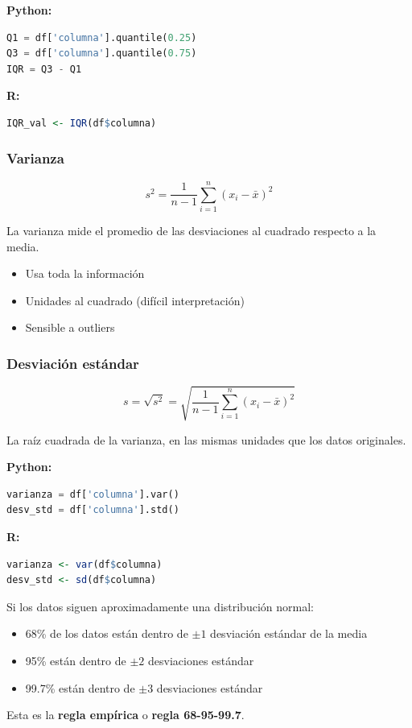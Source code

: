 \documentclass[a4paper,11pt]{article}
\begin{document}
\textbf{Python:}
\begin{lstlisting}[language=Python]
Q1 = df['columna'].quantile(0.25)
Q3 = df['columna'].quantile(0.75)
IQR = Q3 - Q1
\end{lstlisting}

\textbf{R:}
\begin{lstlisting}[language=R]
IQR_val <- IQR(df$columna)
\end{lstlisting}

\subsubsection{Varianza}

$$s^2 = \frac{1}{n-1}\sum_{i=1}^{n}(x_i - \bar{x})^2$$

La varianza mide el promedio de las desviaciones al cuadrado respecto a la media.

\begin{itemize}
    \item Usa toda la información
    \item Unidades al cuadrado (difícil interpretación)
    \item Sensible a outliers
\end{itemize}

\subsubsection{Desviación estándar}

$$s = \sqrt{s^2} = \sqrt{\frac{1}{n-1}\sum_{i=1}^{n}(x_i - \bar{x})^2}$$

La raíz cuadrada de la varianza, en las mismas unidades que los datos originales.

\textbf{Python:}
\begin{lstlisting}[language=Python]
varianza = df['columna'].var()
desv_std = df['columna'].std()
\end{lstlisting}

\textbf{R:}
\begin{lstlisting}[language=R]
varianza <- var(df$columna)
desv_std <- sd(df$columna)
\end{lstlisting}

\begin{tcolorbox}[colback=ejemplocolor!20, colframe=unidadcolor, title=Interpretación de la desviación estándar]
Si los datos siguen aproximadamente una distribución normal:
\begin{itemize}
    \item 68\% de los datos están dentro de $\pm 1$ desviación estándar de la media
    \item 95\% están dentro de $\pm 2$ desviaciones estándar
    \item 99.7\% están dentro de $\pm 3$ desviaciones estándar
\end{itemize}

Esta es la \textbf{regla empírica} o \textbf{regla 68-95-99.7}.
\end{tcolorbox}
\end{document}
